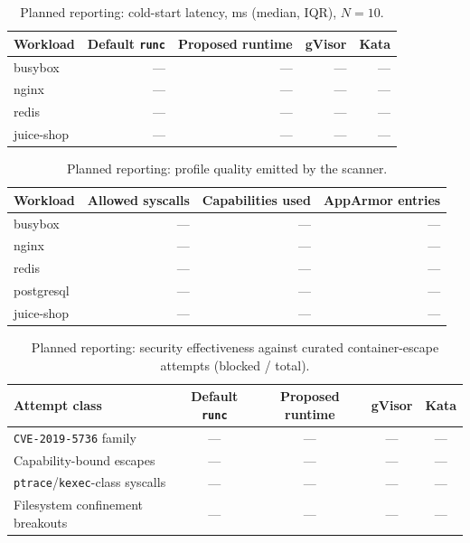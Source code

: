 \begin{table}[ht]
\centering
\caption{Planned reporting: cold-start latency, ms (median, IQR), $N=10$.}
\label{tab:startup}
\begin{tabular}{lrrrr}
\toprule
\textbf{Workload} & \textbf{Default \texttt{runc}} & \textbf{Proposed runtime} & \textbf{gVisor} & \textbf{Kata} \\
\midrule
busybox     & ---  & --- & --- & --- \\
nginx       & ---  & --- & --- & --- \\
redis       & ---  & --- & --- & --- \\
juice-shop  & ---  & --- & --- & --- \\
\bottomrule
\end{tabular}
\end{table}

\begin{table}[ht]
\centering
\caption{Planned reporting: profile quality emitted by the scanner.}
\label{tab:profquality}
\begin{tabular}{lrrr}
\toprule
\textbf{Workload} & \textbf{Allowed syscalls} & \textbf{Capabilities used} & \textbf{AppArmor entries} \\
\midrule
busybox     & --- & --- & --- \\
nginx       & --- & --- & --- \\
redis       & --- & --- & --- \\
postgresql  & --- & --- & --- \\
juice-shop  & --- & --- & --- \\
\bottomrule
\end{tabular}
\end{table}

\begin{table}[ht]
\centering
\caption{Planned reporting: security effectiveness against curated container-escape attempts (blocked / total).}
\label{tab:security}
\begin{tabular}{lcccc}
\toprule
\textbf{Attempt class} & \textbf{Default \texttt{runc}} & \textbf{Proposed runtime} & \textbf{gVisor} & \textbf{Kata} \\
\midrule
\texttt{CVE-2019-5736} family~\cite{cve2019} & --- & --- & --- & --- \\
Capability-bound escapes         & --- & --- & --- & --- \\
\texttt{ptrace}/\texttt{kexec}-class syscalls & --- & --- & --- & --- \\
Filesystem confinement breakouts & --- & --- & --- & --- \\
\bottomrule
\end{tabular}
\end{table}


